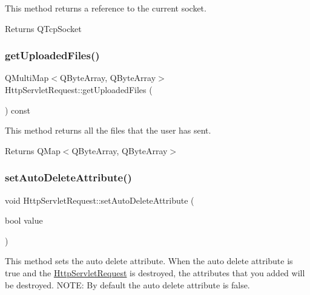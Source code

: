 This method returns a reference to the current socket. 

\begin{DoxyReturn}{Returns}
Q\+Tcp\+Socket 
\end{DoxyReturn}
\mbox{\label{class_http_servlet_request_ac36163c6a4400a8068d746e530940f7a}} 
\subsubsection{\texorpdfstring{get\+Uploaded\+Files()}{getUploadedFiles()}}
{\footnotesize\ttfamily Q\+Multi\+Map$<$Q\+Byte\+Array, Q\+Byte\+Array$>$ Http\+Servlet\+Request\+::get\+Uploaded\+Files (\begin{DoxyParamCaption}{ }\end{DoxyParamCaption}) const\hspace{0.3cm}{\ttfamily [inline]}}



This method returns all the files that the user has sent. 

\begin{DoxyReturn}{Returns}
Q\+Map$<$\+Q\+Byte\+Array, Q\+Byte\+Array$>$ 
\end{DoxyReturn}
\mbox{\label{class_http_servlet_request_a4e58953a673eb24cd67120ecc7f61e93}} 
\subsubsection{\texorpdfstring{set\+Auto\+Delete\+Attribute()}{setAutoDeleteAttribute()}}
{\footnotesize\ttfamily void Http\+Servlet\+Request\+::set\+Auto\+Delete\+Attribute (\begin{DoxyParamCaption}\item[{bool}]{value }\end{DoxyParamCaption})\hspace{0.3cm}{\ttfamily [inline]}}



This method sets the auto delete attribute. When the auto delete attribute is true and the \hyperlink{class_http_servlet_request}{Http\+Servlet\+Request} is destroyed, the attributes that you added will be destroyed. N\+O\+TE\+: By default the auto delete attribute is false. 


